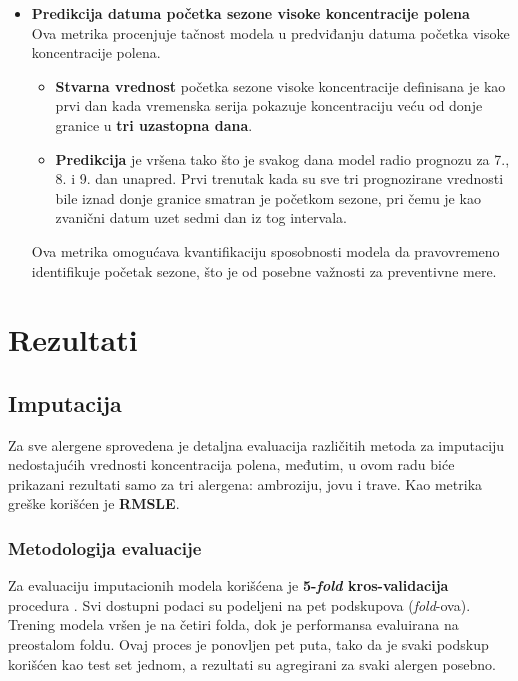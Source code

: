 \documentclass[12pt]{article}
\begin{document}
\begin{itemize}
    \item \textbf{Predikcija datuma početka sezone visoke koncentracije polena} \\
    Ova metrika procenjuje tačnost modela u predviđanju datuma početka visoke koncentracije polena.
    \begin{itemize}
        \item \textbf{Stvarna vrednost} početka sezone visoke koncentracije definisana je kao prvi dan kada vremenska serija pokazuje koncentraciju veću od donje granice u \textbf{tri uzastopna dana}.
        \item \textbf{Predikcija} je vršena tako što je svakog dana model radio prognozu za 7., 8. i 9. dan unapred. Prvi trenutak kada su sve tri prognozirane vrednosti bile iznad donje granice smatran je početkom sezone, pri čemu je kao zvanični datum uzet sedmi dan iz tog intervala.
    \end{itemize}
    Ova metrika omogućava kvantifikaciju sposobnosti modela da pravovremeno identifikuje početak sezone, što je od posebne važnosti za preventivne mere.
\end{itemize}



\newpage
\section{Rezultati}

\subsection{Imputacija}

Za sve alergene sprovedena je detaljna evaluacija različitih metoda za imputaciju nedostajućih vrednosti koncentracija polena, međutim, u ovom radu biće prikazani rezultati samo za tri alergena: ambroziju, jovu i trave. Kao metrika greške korišćen je \textbf{RMSLE}.

\subsubsection{Metodologija evaluacije}

Za evaluaciju imputacionih modela korišćena je \textbf{5-\textit{fold} kros-validacija} procedura \cite{bergmeir2012use}. 
Svi dostupni podaci su podeljeni na pet podskupova (\textit{fold}-ova). Trening modela vršen je na četiri folda, dok je performansa evaluirana na preostalom foldu. 
Ovaj proces je ponovljen pet puta, tako da je svaki podskup korišćen kao test set jednom, a rezultati su agregirani za svaki alergen posebno.
\end{document}
